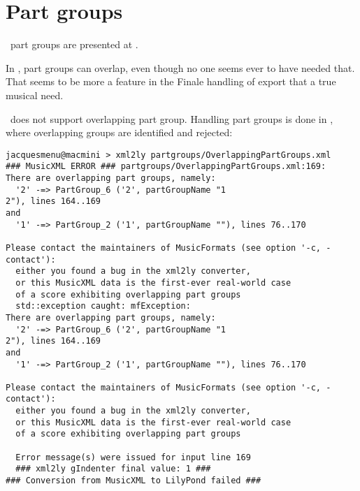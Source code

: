 



\chapter{Part groups}\label{Part groups}

\mf\ part groups are presented at .

In \mxml, part groups can overlap, even though no one seems ever to have needed that. That seems to be more a feature in the Finale handling of \mxml export that a true musical need.

\msrRepr\ does not support overlapping part group. Handling part groups is done in , where overlapping groups are identified and rejected:
\begin{lstlisting}[language=Terminal]
jacquesmenu@macmini > xml2ly partgroups/OverlappingPartGroups.xml
### MusicXML ERROR ### partgroups/OverlappingPartGroups.xml:169:
There are overlapping part groups, namely:
  '2' -=> PartGroup_6 ('2', partGroupName "1
2"), lines 164..169
and
  '1' -=> PartGroup_2 ('1', partGroupName ""), lines 76..170

Please contact the maintainers of MusicFormats (see option '-c, -contact'):
  either you found a bug in the xml2ly converter,
  or this MusicXML data is the first-ever real-world case
  of a score exhibiting overlapping part groups
  std::exception caught: mfException:
There are overlapping part groups, namely:
  '2' -=> PartGroup_6 ('2', partGroupName "1
2"), lines 164..169
and
  '1' -=> PartGroup_2 ('1', partGroupName ""), lines 76..170

Please contact the maintainers of MusicFormats (see option '-c, -contact'):
  either you found a bug in the xml2ly converter,
  or this MusicXML data is the first-ever real-world case
  of a score exhibiting overlapping part groups

  Error message(s) were issued for input line 169
  ### xml2ly gIndenter final value: 1 ###
### Conversion from MusicXML to LilyPond failed ###
\end{lstlisting}

